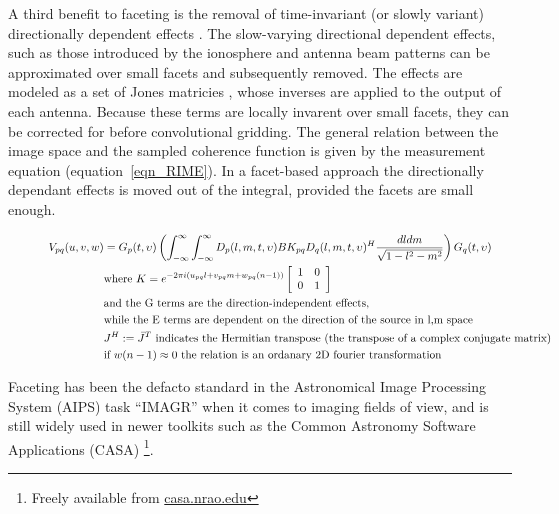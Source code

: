 \documentclass[a4paper, two column]{article}
\begin{document}
A third benefit to faceting is the removal of time-invariant (or slowly variant) directionally dependent effects \cite{2011A&A...527A.107S}. The slow-varying directional dependent effects, such as those introduced by the 
ionosphere and antenna beam patterns can be approximated over small facets and subsequently removed. The effects are modeled as a set of Jones matricies \cite{2011A&A...527A.106S}, whose inverses are applied to the output of each antenna. Because these terms are locally invarent over small 
facets, they can be corrected for before convolutional gridding. The general relation between the image space and the sampled coherence function is given by the measurement equation (equation~\ref{eqn_RIME}). In a facet-based approach
the directionally dependant effects is moved out of the integral, provided the facets are small enough.

\begin{figure}
\begin{mdframed}
\begin{equation}
\label{eqn_RIME}
\begin{split}
    V_{pq}(u,v,w) &= G_p(t,\upsilon)\left(\int_{-\infty}^{\infty}\int_{-\infty}^{\infty}D_p(l,m,t,\upsilon)BK_{pq}D_q(l,m,t,\upsilon)^H\frac{dldm}{\sqrt{1-l^2-m^2}}\right)G_q(t,\upsilon)\\
	  &\text{where }K = e^{-2\pi i(u_{pq}l+v_{pq}m+w_{pq}(n-1))}
    \left[\begin{array}{c c}
     1 & 0 \\
     0 & 1 \\
    \end{array}\right]\\
	 &\text{and the G terms are the direction-independent effects,}\\
	 &\text{while the E terms are dependent on the direction of the source in l,m space}\\
 	 &J^H:=\bar J^T \text{ indicates the Hermitian transpose (the transpose of a complex conjugate matrix)}\\ 
 	 &\text{if }w(n-1)\approx 0\text{ the relation is an ordanary 2D fourier transformation}
\end{split}
\end{equation}
\end{mdframed}
\end{figure}

Faceting has been the defacto standard in the Astronomical Image Processing System (AIPS) task ``IMAGR'' \cite{AIPS113} when it comes to imaging fields of view, and is still 
widely used in newer toolkits such as the Common Astronomy Software Applications (CASA) \footnote{Freely available from \url{casa.nrao.edu}}. 
\end{document}
